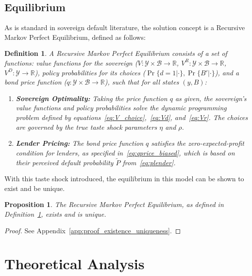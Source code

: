\documentclass[12pt]{article}
\theoremstyle{plain}
\newtheorem{definition}{Definition}
\newtheorem{proposition}{Proposition}
\begin{document}
\subsection{Equilibrium}

As is standard in sovereign default literature, the solution concept is a
Recursive Markov Perfect Equilibrium, defined as follows:

\begin{definition}
	\label{def:equilibrium}
	A Recursive Markov Perfect Equilibrium consists of a set of functions: value functions for the sovereign ($V:\mathcal{Y}\times\mathcal{B}\to\mathbb{R}$, $V^R:\mathcal{Y}\times\mathcal{B}\to\mathbb{R}$, $V^D:\mathcal{Y}\to\mathbb{R}$), policy probabilities for its choices ($\Pr\{d=1|\cdot\}, \Pr\{B'|\cdot\}$), and a bond price function ($q:\mathcal{Y}\times\mathcal{B}\to\mathbb{R}$), such that for all states $(y, B)$:
	\begin{enumerate}
		\item \textbf{Sovereign Optimality:} Taking the price function $q$ as given, the sovereign's value functions and policy probabilities solve the dynamic programming problem defined by equations~\eqref{eq:V_choice},~\eqref{eq:Vd}, and~\eqref{eq:Vr}. The choices are governed by the true taste shock parameters $\eta$ and $\rho$.
		\item \textbf{Lender Pricing:} The bond price function $q$ satisfies the zero-expected-profit condition for lenders, as specified in~\eqref{eq:qprice_biased}, which is based on their perceived default probability $\tilde{P}$ from~\eqref{eq:plender}.
	\end{enumerate}
\end{definition}

With this taste shock introduced, the equilibrium in this model can be shown to
exist and be unique.
\begin{proposition}\label{prop:existence_uniqueness}
	The Recursive Markov Perfect Equilibrium, as defined in Definition~\ref{def:equilibrium}, exists and is unique.
\end{proposition}

\begin{proof}
	See Appendix~\ref{app:proof_existence_uniqueness}.
\end{proof}

\section{Theoretical Analysis}
\label{sec:theory}
\end{document}
